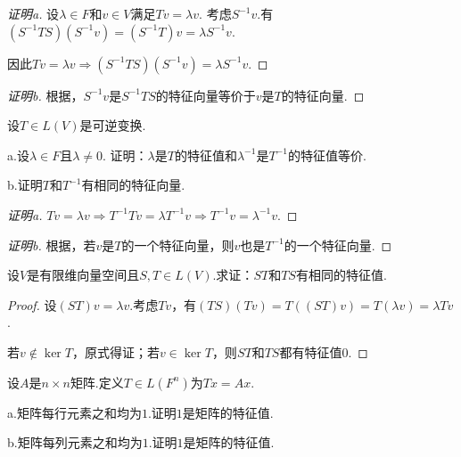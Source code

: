 \begin{proof}[证明a]
    设\(\lambda \in F\)和\(v \in V\)满足\(Tv=\lambda v\).
    考虑\(S^{-1}v\).有\((S^{-1}TS)(S^{-1}v)=(S^{-1}T)v=\lambda S^{-1}v\).
    
    因此\(Tv=\lambda v \Rightarrow (S^{-1}TS)(S^{-1}v)=\lambda S^{-1}v\).
\end{proof}

\begin{proof}[证明b]
    根据，\(S^{-1}v\)是\(S^{-1}TS\)的特征向量等价于\(v\)是\(T\)的特征向量.
\end{proof}

\begin{problem}[21]\label{5.A.21}
    设\(T \in L(V)\)是可逆变换.

    a.设\(\lambda \in F\)且\(\lambda \ne 0\).
    证明：\(\lambda\)是\(T\)的特征值和\(\lambda^{-1}\)是\(T^{-1}\)的特征值等价.
    
    b.证明\(T\)和\(T^{-1}\)有相同的特征向量.
\end{problem}

\begin{proof}[证明a]
    \(Tv=\lambda v \Rightarrow T^{-1}Tv=\lambda T^{-1}v \Rightarrow T^{-1}v=\lambda^{-1} v\).
\end{proof}

\begin{proof}[证明b]
    根据，若\(v\)是\(T\)的一个特征向量，则\(v\)也是\(T^{-1}\)的一个特征向量.
\end{proof}

\newpage

\begin{problem}[23]\label{5.A.23}
    设\(V\)是有限维向量空间且\(S,T \in L(V)\).求证：\(ST\)和\(TS\)有相同的特征值.
\end{problem}

\begin{proof}
    设\((ST)v=\lambda v\).考虑\(Tv\)，有\((TS)(Tv)=T((ST)v)=T(\lambda v)=\lambda Tv\).

    若\(v \notin \ker T\)，原式得证；若\(v \in \ker T\)，则\(ST\)和\(TS\)都有特征值\(0\).
\end{proof}

\begin{problem}[24]\label{5.A.24}
    设\(A\)是\(n \times n\)矩阵.定义\(T \in L(F^n)\)为\(Tx=Ax\).

    a.矩阵每行元素之和均为\(1\).证明\(1\)是矩阵的特征值.

    b.矩阵每列元素之和均为\(1\).证明\(1\)是矩阵的特征值.    
\end{problem}

